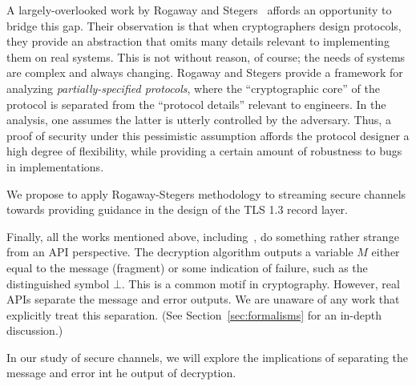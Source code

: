 A largely-overlooked work by Rogaway and Stegers~\cite{RS09}
affords an opportunity to bridge this gap. Their observation is that when
cryptographers design protocols, they provide an abstraction that omits many
details relevant to implementing them on real systems.
%
This is not without reason, of course; the needs of systems are complex and always
changing.
%
%
Rogaway and Stegers provide a framework for analyzing \emph{partially-specified
protocols}, where the ``cryptographic core'' of the protocol is separated from
the ``protocol details'' relevant to engineers. In the analysis, one assumes the
latter is utterly controlled by the adversary. Thus, a proof of security under
this pessimistic assumption affords the protocol designer a high degree of
flexibility, while providing a certain amount of robustness to bugs in
implementations.

\begin{task}\label{task:sc}
  We propose to apply Rogaway-Stegers methodology to streaming secure channels
  towards providing guidance in the design of the TLS 1.3 record layer.
\end{task}

\noindent
{}
Finally, all the works mentioned above, including~\cite{FPMG15}, do something
rather strange from an API perspective.
%
The decryption algorithm outputs a variable $M$ either equal to the message
(fragment) or some indication of failure, such as the distinguished symbol
$\bot$. This is a common motif in cryptography. However, real APIs separate the
message and error outputs. We are unaware of any work  that explicitly treat this separation.
%
(See Section~\ref{sec:formalisms} for an in-depth discussion.)

\begin{task}\label{task:sc}
  In our study of secure channels, we will explore the implications of
  separating the message and error int he output of decryption.
\end{task}

